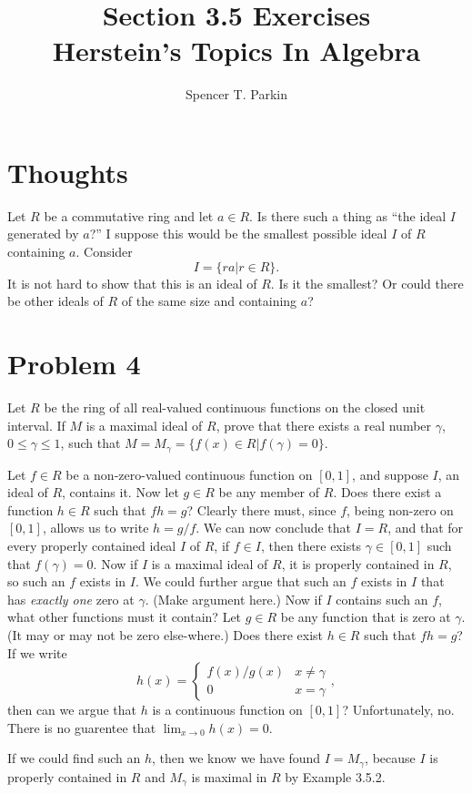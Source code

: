 \documentclass[12pt]{article}
\title{Section 3.5 Exercises\\Herstein's Topics In Algebra}
\author{Spencer T. Parkin}
\begin{document}
\maketitle

\section*{Thoughts}

Let $R$ be a commutative ring and let $a\in R$.  Is there such a thing as ``the ideal $I$ generated by $a$?''
I suppose this would be the smallest possible ideal $I$ of $R$ containing $a$.
Consider
\begin{equation*}
I = \{ra|r\in R\}.
\end{equation*}
It is not hard to show that this is an ideal of $R$.  Is it the smallest?  Or could there be other ideals
of $R$ of the same size and containing $a$?

\section*{Problem 4}

Let $R$ be the ring of all real-valued continuous functions on the closed unit interval.
If $M$ is a maximal ideal of $R$, prove that there exists a real number $\gamma$,
$0\leq\gamma\leq 1$, such that $M=M_{\gamma}=\{f(x)\in R|f(\gamma)=0\}$.

Let $f\in R$ be a non-zero-valued continuous function on $[0,1]$, and suppose $I$, an ideal of $R$,
contains it.  Now let $g\in R$ be any member of $R$.  Does there exist a function $h\in R$ such that
$fh=g$?  Clearly there must, since $f$, being non-zero on $[0,1]$, allows us to write $h=g/f$.
We can now conclude that $I=R$, and that for every properly contained ideal $I$ of $R$, if $f\in I$,
then there exists $\gamma\in[0,1]$ such that $f(\gamma)=0$.
Now if $I$ is a maximal ideal of $R$, it is properly contained in $R$, so such an $f$ exists in $I$.
We could further argue that such an $f$ exists in $I$ that has {\it exactly one} zero at $\gamma$.
(Make argument here.)
Now if $I$ contains such an $f$, what other functions must it contain?
Let $g\in R$ be any function that is zero at $\gamma$.  (It may or may not be zero else-where.)
Does there exist $h\in R$ such that $fh=g$?  If we write
\begin{equation*}
h(x) = \left\{\begin{array}{ll}f(x)/g(x) & x\neq\gamma\\ 0 & x=\gamma \end{array}\right.,
\end{equation*}
then can we argue that $h$ is a continuous function on $[0,1]$?  Unfortunately, no.
There is no guarentee that $\lim_{x\to 0} h(x)=0$.

If we could find such an $h$, then we know we have found $I=M_{\gamma}$, because
$I$ is properly contained in $R$ and $M_{\gamma}$ is maximal in $R$ by Example 3.5.2.
\end{document}
